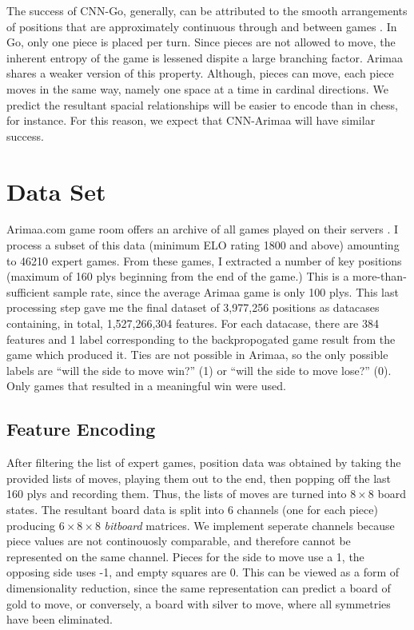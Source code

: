 \documentclass{article}
\begin{document}
The success of CNN-Go, generally, can be attributed to the smooth arrangements of positions that are approximately continuous through and between games \cite{Oshri_Khandwala}.  In Go, only one piece is placed per turn.  Since pieces are not allowed to move, the inherent entropy of the game is lessened dispite a large branching factor.  Arimaa shares a weaker version of this property.  Although, pieces can move, each piece moves in the same way, namely one space at a time in cardinal directions.  We predict the resultant spacial relationships will be easier to encode than in chess, for instance.  For this reason, we expect that CNN-Arimaa will have similar success.

\section{Data Set}
Arimaa.com game room offers an archive of all games played on their servers \cite{arimaa_com}\cite{games}.  I process a subset of this data (minimum ELO rating 1800 and above) amounting to 46210 expert games.  From these games, I extracted a number of key positions (maximum of 160 plys beginning from the end of the game.)  This is a more-than-sufficient sample rate, since the average Arimaa game is only 100 plys.  This last processing step gave me the final dataset of 3,977,256 positions as datacases containing, in total, 1,527,266,304 features.  For each datacase, there are 384 features and 1 label corresponding to the backpropogated game result from the game which produced it.  Ties are not possible in Arimaa, so the only possible labels are ``will the side to move win?'' (1) or ``will the side to move lose?'' (0).  Only games that resulted in a meaningful win were used.

\subsection{Feature Encoding}
After filtering the list of expert games, position data was obtained by taking the provided lists of moves, playing them out to the end, then popping off the last 160 plys and recording them.  Thus, the lists of moves are turned into  $8\times 8$ board states.  The resultant board data is split into 6 channels (one for each piece) producing $6\times 8\times 8$ \textit{bitboard} matrices.  We implement seperate channels because piece values are not continouosly comparable, and therefore cannot be represented on the same channel.  Pieces for the side to move use a 1, the opposing side uses -1, and empty squares are 0.  This can be viewed as a form of dimensionality reduction, since the same representation can predict a board of gold to move, or conversely, a board with silver to move, where all symmetries have been eliminated.
\end{document}
